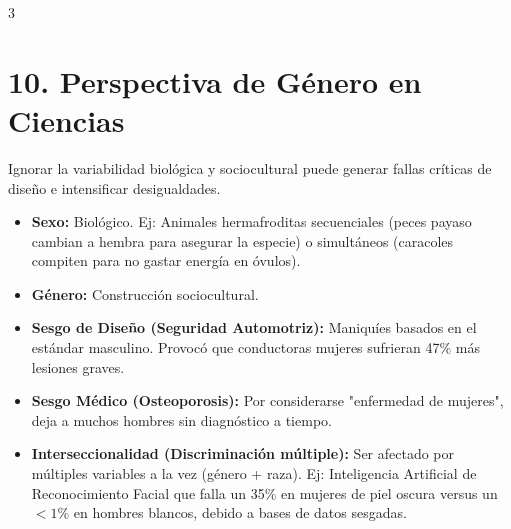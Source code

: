 \documentclass[9pt,letterpaper]{extarticle}
\begin{document}
\begin{multicols*}{3}
	\section*{10. Perspectiva de Género en Ciencias}
	Ignorar la variabilidad biológica y sociocultural puede generar fallas críticas de diseño e intensificar desigualdades.
	\begin{itemize}
		\item \textbf{Sexo:} Biológico. Ej: Animales hermafroditas secuenciales (peces payaso cambian a hembra para asegurar la especie) o simultáneos (caracoles compiten para no gastar energía en óvulos).
		\item \textbf{Género:} Construcción sociocultural. 
		\item \textbf{Sesgo de Diseño (Seguridad Automotriz):} Maniquíes basados en el estándar masculino. Provocó que conductoras mujeres sufrieran 47\% más lesiones graves.
		\item \textbf{Sesgo Médico (Osteoporosis):} Por considerarse "enfermedad de mujeres", deja a muchos hombres sin diagnóstico a tiempo.
		\item \textbf{Interseccionalidad (Discriminación múltiple):} Ser afectado por múltiples variables a la vez (género + raza). Ej: Inteligencia Artificial de Reconocimiento Facial que falla un 35\% en mujeres de piel oscura versus un $<1\%$ en hombres blancos, debido a bases de datos sesgadas.
	\end{itemize}

	\vfill\null
\end{multicols*}
\end{document}
